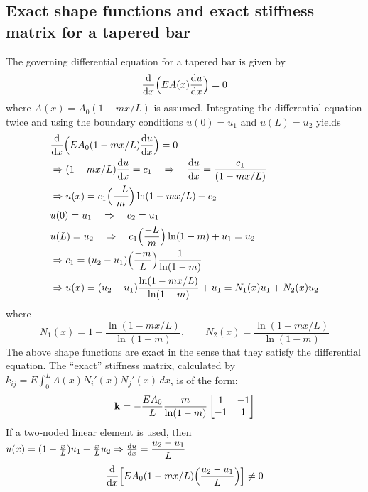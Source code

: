 \subsection{Exact shape functions and exact stiffness matrix for a tapered bar}
The governing differential equation for a tapered bar is given by
\begin{equation}
  \frac{\mathrm{d} }{\mathrm{d} x}\Bigl(EA(x)\frac{\mathrm{d} u}{\mathrm{d} x}\Bigr) = 0
\end{equation}
where $A(x) = A_0(1-mx/L)$ is assumed. Integrating the differential equation twice and using the boundary conditions $u(0) = u_1$ and $u(L) = u_2$ yields
\begin{align*}
  &\frac{\mathrm{d} }{\mathrm{d} x}\Bigl(EA_0(1-mx/L)\frac{\mathrm{d} u}{\mathrm{d} x}\Bigr) = 0\\
  &\Rightarrow (1-mx/L)\frac{\mathrm{d} u}{\mathrm{d} x} = c_1 \quad\Rightarrow\quad \frac{\mathrm{d} u}{\mathrm{d} x} = \frac{c_1}{(1-mx/L)}\\
  &\Rightarrow u(x) = c_1\Bigl(\frac{-L}{m}\Bigr)\ln(1-mx/L) + c_2\\
  &u(0) = u_1 \quad\Rightarrow\quad c_2 = u_1\\
  &u(L) = u_2 \quad\Rightarrow\quad c_1\Bigl(\frac{-L}{m}\Bigr)\ln(1-m) + u_1 = u_2\\
  &\Rightarrow c_1 = (u_2-u_1)\Bigl(\frac{-m}{L}\Bigr)\frac{1}{\ln(1-m)}\\
  &\Rightarrow u(x) = (u_2-u_1)\frac{\ln(1-mx/L)}{\ln(1-m)} + u_1 = N_1(x)u_1 + N_2(x)u_2
\end{align*}
where
\begin{equation}
  N_1(x) = 1 - \frac{\ln(1-mx/L)}{\ln(1-m)},\qquad N_2(x) = \frac{\ln(1-mx/L)}{\ln(1-m)}
\end{equation}
The above shape functions are exact in the sense that they satisfy the differential equation. The ``exact'' stiffness matrix, calculated by $k_{ij} = E\int_0^L A(x)N_i'(x)N_j'(x)\,dx$, is of the form:
\begin{equation}
  \mathbf{k} = -\frac{EA_0}{L}\frac{m}{\ln(1-m)}\begin{bmatrix}1 & -1\\ -1 & 1\end{bmatrix}
\end{equation}
If a two-noded linear element is used, then $u(x) = (1-\frac xL)u_1 + \frac xL u_2 \Rightarrow \frac{\mathrm{d} u}{\mathrm{d} x} = \dfrac{u_2-u_1}{L}$
\begin{equation*}
  \frac{\mathrm{d} }{\mathrm{d} x}\Bigl[EA_0(1-mx/L)\Bigl(\frac{u_2-u_1}{L}\Bigr)\Bigr] \neq 0
\end{equation*}

